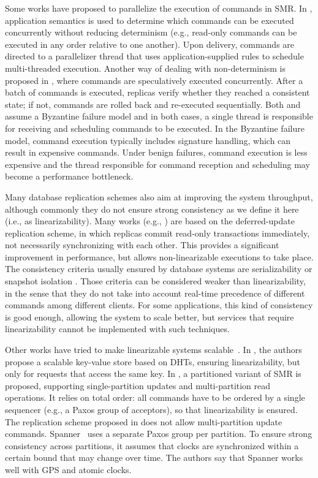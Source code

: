 \documentclass[11pt]{article}
\begin{document}
Some works have proposed to parallelize the execution of commands in SMR.
In \cite{kotla2004htbft}, application semantics is used to determine which commands can be executed concurrently without reducing determinism (e.g., read-only commands can be executed in any order relative to one another).
Upon delivery, commands are directed to a parallelizer thread that uses application-supplied rules to schedule multi-threaded execution.
Another way of dealing with non-determinism is proposed in \cite{kapritsos2012eve}, where commands are speculatively executed concurrently.
After a batch of commands is executed, replicas verify whether they reached a consistent state; if not, commands are rolled back and re-executed sequentially.
Both \cite{kotla2004htbft} and \cite{kapritsos2012eve} assume a Byzantine failure model and in both cases, a single thread is responsible for receiving and scheduling commands to be executed.
In the Byzantine failure model, command execution typically includes signature handling, which can result in expensive commands.
Under benign failures, command execution is less expensive and the thread responsible for command reception and scheduling may become a performance bottleneck.

Many database replication schemes also aim at improving the system throughput, although commonly they do not ensure strong consistency as we define it here (i.e., as linearizability). Many works (e.g., \cite{chundi96dur, kobus2013hybrid, sciascia2012sdur, SousaOMP01}) are based on the deferred-update replication scheme, in which replicas commit read-only transactions immediately, not necessarily synchronizing with each other. This provides a significant improvement in performance, but allows non-linearizable executions to take place. The consistency criteria usually ensured by database systems are serializability \cite{BHG87} or snapshot isolation \cite{LinKJPA09}. Those criteria can be considered weaker than linearizability, in the sense that they do not take into account real-time precedence of different commands among different clients. For some applications, this kind of consistency is good enough, allowing the system to scale better, but services that require linearizability cannot be implemented with such techniques.

Other works have tried to make linearizable systems scalable~\cite{corbett2013spanner, Glendenning2011, Marandi11}.
In \cite{Glendenning2011}, the authors propose a scalable key-value store based on DHTs, ensuring linearizability, but only for requests that access the same key.
In \cite{Marandi11}, a partitioned variant of SMR is proposed, supporting single-partition updates and multi-partition read operations.
It relies on total order: all commands have to be ordered by a single sequencer (e.g., a Paxos group of acceptors), so that linearizability is ensured.
The replication scheme proposed in \cite{Marandi11} does not allow multi-partition update commands.
Spanner~\cite{corbett2013spanner} uses a separate Paxos group per partition.
To ensure strong consistency across partitions, it assumes that clocks are synchronized within a certain bound that may change over time.
The authors say that Spanner works well with GPS and atomic clocks.
\end{document}
